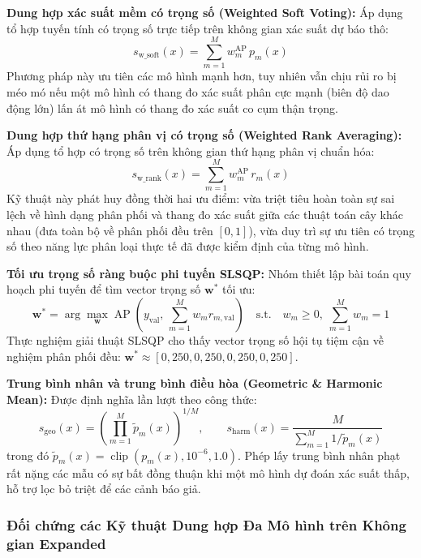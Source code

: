 \textbf{Dung hợp xác suất mềm có trọng số (Weighted Soft Voting):} Áp dụng tổ hợp tuyến tính có trọng số trực tiếp trên không gian xác suất dự báo thô:
\begin{equation*}
    s_{\mathrm{w\_soft}}(x) = \sum_{m=1}^{M} w_m^{\mathrm{AP}} \, p_m(x)
\end{equation*}
Phương pháp này ưu tiên các mô hình mạnh hơn, tuy nhiên vẫn chịu rủi ro bị méo mó nếu một mô hình có thang đo xác suất phân cực mạnh (biên độ dao động lớn) lấn át mô hình có thang đo xác suất co cụm thận trọng.

\textbf{Dung hợp thứ hạng phân vị có trọng số (Weighted Rank Averaging):} Áp dụng tổ hợp có trọng số trên không gian thứ hạng phân vị chuẩn hóa:
\begin{equation*}
    s_{\mathrm{w\_rank}}(x) = \sum_{m=1}^{M} w_m^{\mathrm{AP}} \, r_m(x)
\end{equation*}
Kỹ thuật này phát huy đồng thời hai ưu điểm: vừa triệt tiêu hoàn toàn sự sai lệch về hình dạng phân phối và thang đo xác suất giữa các thuật toán cây khác nhau (đưa toàn bộ về phân phối đều trên $[0, 1]$), vừa duy trì sự ưu tiên có trọng số theo năng lực phân loại thực tế đã được kiểm định của từng mô hình.

\textbf{Tối ưu trọng số ràng buộc phi tuyến SLSQP:} Nhóm thiết lập bài toán quy hoạch phi tuyến để tìm vector trọng số $\mathbf{w}^*$ tối ưu:
\begin{equation*}
    \mathbf{w}^* = \arg\max_{\mathbf{w}} \operatorname{AP}\left(y_{\text{val}}, \, \sum_{m=1}^{M} w_m r_{m,\text{val}}\right) \quad \text{s.t.} \quad w_m \ge 0, \; \sum_{m=1}^{M} w_m = 1
\end{equation*}
Thực nghiệm giải thuật SLSQP cho thấy vector trọng số hội tụ tiệm cận về nghiệm phân phối đều: $\mathbf{w}^* \approx [0{,}250, 0{,}250, 0{,}250, 0{,}250]$.

\textbf{Trung bình nhân và trung bình điều hòa (Geometric \& Harmonic Mean):} Được định nghĩa lần lượt theo công thức:
\begin{equation*}
    s_{\mathrm{geo}}(x) = \left(\prod_{m=1}^{M}\tilde p_m(x)\right)^{1/M}, \qquad s_{\mathrm{harm}}(x) = \frac{M}{\sum_{m=1}^{M}1/\tilde p_m(x)}
\end{equation*}
trong đó $\tilde p_m(x) = \operatorname{clip}(p_m(x), 10^{-6}, 1.0)$. Phép lấy trung bình nhân phạt rất nặng các mẫu có sự bất đồng thuận khi một mô hình dự đoán xác suất thấp, hỗ trợ lọc bỏ triệt để các cảnh báo giả.

\subsubsection{Đối chứng các Kỹ thuật Dung hợp Đa Mô hình trên Không gian Expanded}


